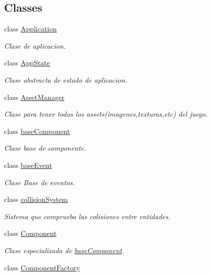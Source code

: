 \subsection*{Classes}
\begin{DoxyCompactItemize}
\item 
class \hyperlink{classant_1_1_application}{Application}
\begin{DoxyCompactList}\small\item\em Clase de aplicacion. \end{DoxyCompactList}\item 
class \hyperlink{classant_1_1_app_state}{App\+State}
\begin{DoxyCompactList}\small\item\em Clase abstracta de estado de aplicacion. \end{DoxyCompactList}\item 
class \hyperlink{classant_1_1_asset_manager}{Asset\+Manager}
\begin{DoxyCompactList}\small\item\em Clase para tener todos los assets(imagenes,texturas,etc) del juego. \end{DoxyCompactList}\item 
class \hyperlink{classant_1_1base_component}{base\+Component}
\begin{DoxyCompactList}\small\item\em Clase base de componente. \end{DoxyCompactList}\item 
class \hyperlink{classant_1_1base_event}{base\+Event}
\begin{DoxyCompactList}\small\item\em Clase Base de eventos. \end{DoxyCompactList}\item 
class \hyperlink{classant_1_1collision_system}{collision\+System}
\begin{DoxyCompactList}\small\item\em Sistema que comprueba las colisiones entre entidades. \end{DoxyCompactList}\item 
class \hyperlink{classant_1_1_component}{Component}
\begin{DoxyCompactList}\small\item\em Clase especializada de \hyperlink{classant_1_1base_component}{base\+Component}. \end{DoxyCompactList}\item 
class \hyperlink{classant_1_1_component_factory}{Component\+Factory}

\end{DoxyCompactItemize}
